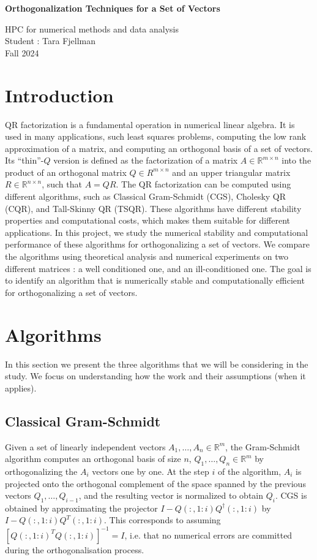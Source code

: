 \documentclass[a4paper, 12pt,oneside]{article}
\begin{document}
 
	\begin{center}
	    \Large
	    \textbf{Orthogonalization Techniques for a Set of Vectors}
	        
	    \vspace{0.4cm}
	    \large
		HPC for numerical methods and data analysis \\
	    Student : Tara Fjellman \\
	    \small{Fall 2024}
	\end{center}
	\section{Introduction}
	QR factorization is a fundamental operation in numerical linear algebra. It is used in many applications, such least squares problems, computing the low rank approximation of a matrix, and computing an orthogonal basis of a set of vectors. Its ``thin''-$Q$ version is defined as the factorization of a matrix ${A}\in \mathbb{R}^{m \times n}$ into the product of an orthogonal matrix ${Q}\in {R}^{m \times n}$ and an upper triangular matrix ${R}\in \mathbb{R}^{n \times n}$, such that ${A} = {Q} {R}$. The QR factorization can be computed using different algorithms, such as Classical Gram-Schmidt (CGS), Cholesky QR (CQR), and Tall-Skinny QR (TSQR). These algorithms have different stability properties and computational costs, which makes them suitable for different applications. In this project, we study the numerical stability and computational performance of these algorithms for orthogonalizing a set of vectors. We compare the algorithms using theoretical analysis and numerical experiments on two different matrices : a well conditioned one, and an ill-conditioned one. The goal is to identify an algorithm that is numerically stable and computationally efficient for orthogonalizing a set of vectors.
	\section{Algorithms}
		In this section we present the three algorithms that we will be considering in the study. We focus on understanding how the work and their assumptions (when it applies). 
		\subsection{Classical Gram-Schmidt}
			Given a set of linearly independent vectors $A_1, \ldots, A_n \in \mathbb{R}^m$, the Gram-Schmidt algorithm computes an orthogonal basis of size $n$,  $Q_1, \ldots, Q_n \in \mathbb{R}^m$ by orthogonalizing the $A_i$ vectors one by one. At the step $i$ of the algorithm, $A_i$ is projected onto the orthogonal complement of the space spanned by the previous vectors $Q_1, \ldots, Q_{i-1}$, and the resulting vector is normalized to obtain $Q_i$.
			CGS is obtained by approximating the projector $I-Q(:,1:i)Q^\dagger(:,1:i)$ by $I-Q(:,1:i)Q^T(:,1:i)$. This corresponds to assuming $[Q(:,1:i)^TQ(:,1:i)]^{-1}=I$, i.e. that no numerical errors are committed during the orthogonalisation process. 
\end{document}
